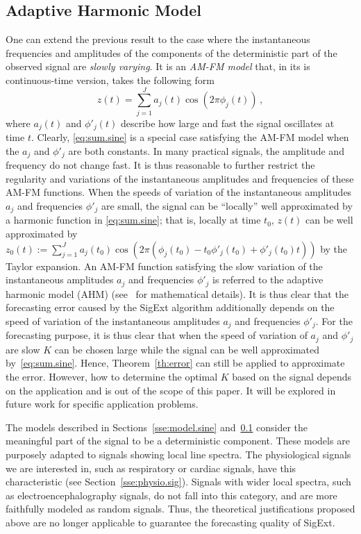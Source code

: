 \subsection{Adaptive Harmonic Model}
\label{RemarkAHM}

One can extend the previous result to the case where the instantaneous frequencies and amplitudes of the components of the deterministic part of the observed signal are {\em slowly varying}. It is an \textit{AM-FM model} that, in its is continuous-time version, takes the following form
\begin{equation}
z(t) = \sum_{j=1}^J a_j(t)\cos(2\pi\phi_j(t))\,,
\end{equation}
where $a_j(t)$ and $\phi'_j(t)$ describe how large and fast the signal oscillates at time $t$. 
Clearly, \eqref{eq:sum.sine} is a special case satisfying the AM-FM model when the $a_j$ and $\phi'_j$ are both constants. 
%
In many practical signals, the amplitude and frequency do not change fast. It is thus reasonable to further restrict the regularity and variations of the instantaneous amplitudes and frequencies of these AM-FM functions. When the speeds of variation of the instantaneous amplitudes $a_j$ and frequencies $\phi'_j$ are small, the signal can be ``locally'' well approximated by a harmonic function in \eqref{eq:sum.sine}; that is, 
%
locally at time $t_0$, $z(t)$ can be well approximated by $z_0(t) := \sum_{j=1}^J a_j(t_0)\cos(2\pi(\phi_j(t_0)-t_0\phi'_j(t_0)+\phi'_j(t_0)t))$ by the Taylor expansion. An AM-FM function satisfying the slow variation of the instantaneous amplitudes $a_j$ and frequencies $\phi'_j$ is referred to the adaptive harmonic model (AHM) (see~\cite{Chen14nonparametric,Daubechies16conceft} for mathematical details).
It is thus clear that the forecasting error caused by the {\sf SigExt} algorithm additionally depends on the speed of variation of the instantaneous amplitudes $a_j$ and frequencies $\phi'_j$. 
%
For the forecasting purpose, it is thus clear that when the speed of variation of $a_j$ and $\phi'_j$ are slow $K$ can be chosen large while the signal can be well approximated by~\eqref{eq:sum.sine}. Hence, Theorem~\ref{th:error} can still be applied to approximate the error. However, how to determine the optimal $K$ based on the signal depends on the application and is out of the scope of this paper. It will be explored in future work for specific application problems.

The models described in Sections~\ref{sse:model.sine} and~\ref{RemarkAHM} consider the meaningful part of the signal to be a deterministic component. These models are purposely adapted to signals showing local line spectra. The physiological signals we are interested in, such as respiratory or cardiac signals, have this characteristic (see Section~\ref{sse:physio.sig}). Signals with wider local spectra, such as electroencephalography signals, do not fall into this category, and are more faithfully modeled as random signals. Thus, the theoretical justifications proposed above are no longer applicable to guarantee the forecasting quality of {\sf SigExt}.

